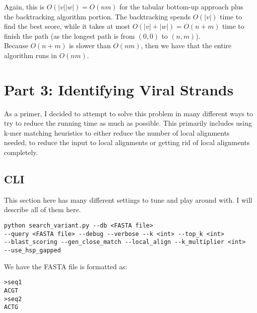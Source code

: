 \documentclass[10pt]{article}
\begin{document}
Again, this is $O(|v||w|) = O(nm)$ for the tabular bottom-up approach plus the backtracking algorithm portion. The backtracking spends $O(|v|)$ time to find the best score, while it takes at most $O(|v| + |w|) = O(n + m)$ time to finish the path (as the longest path is from $(0, 0)$ to $(n, m)$).\\

Because $O(n + m)$ is slower than $O(nm)$, then we have that the entire algorithm runs in $O(nm)$.

\section*{Part 3: Identifying Viral Strands}
As a primer, I decided to attempt to solve this problem in many different ways to try to reduce the running time as much as possible. This primarily includes using k-mer matching heuristics to either reduce the number of local alignments needed, to reduce the input to local alignments or getting rid of local alignments completely.

\subsection*{CLI}
This section here has many different settings to tune and play around with. I will describe all of them here.
\begin{lstlisting}
python search_variant.py --db <FASTA file> 
--query <FASTA file> --debug --verbose --k <int> --top_k <int>
--blast_scoring --gen_close_match --local_align --k_multiplier <int>
--use_hsp_gapped
\end{lstlisting}

We have the FASTA file is formatted as:
\begin{lstlisting}
>seq1
ACGT
>seq2
ACTG
\end{lstlisting}
\end{document}
